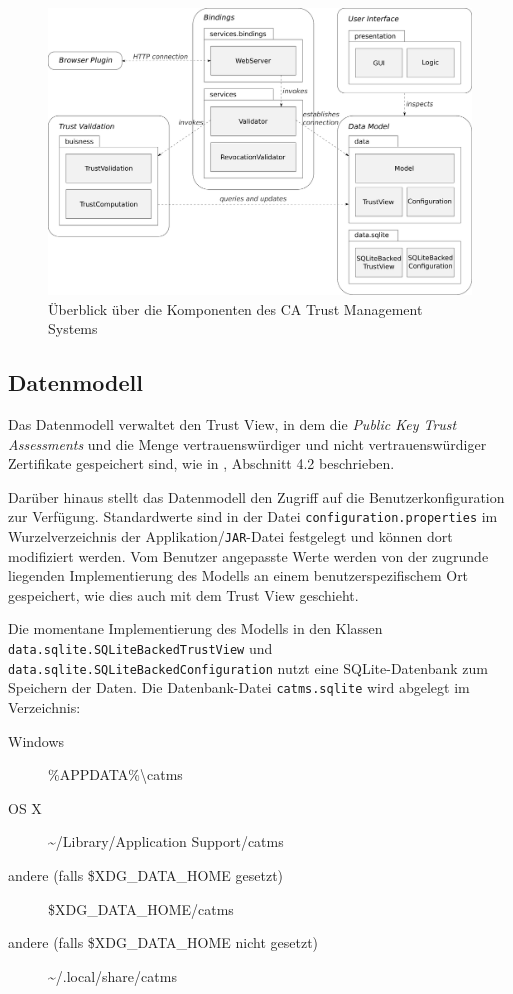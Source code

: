 \documentclass[accentcolor=tud1c,article,colorback,11pt]{tudreport}
\begin{document}
\begin{figure}[h]
  \centering
  \includegraphics[width=\textwidth]{overview}
  \caption{Überblick über die Komponenten des CA Trust Management Systems}
  \label{overview}
\end{figure}

\subsection{Datenmodell}
Das Datenmodell verwaltet den Trust View, in dem die \textit{Public Key Trust Assessments} und die Menge vertrauenswürdiger und nicht vertrauenswürdiger Zertifikate gespeichert sind, wie in \cite{braun2013trust}, Abschnitt 4.2 beschrieben.

Darüber hinaus stellt das Datenmodell den Zugriff auf die Benutzerkonfiguration zur Verfügung. Standardwerte sind in der Datei \texttt{configuration.properties} im Wurzelverzeichnis der Applikation/\texttt{JAR}-Datei festgelegt und können dort modifiziert werden. Vom Benutzer angepasste Werte werden von der zugrunde liegenden Implementierung des Modells an einem benutzerspezifischem Ort gespeichert, wie dies auch mit dem Trust View geschieht.

Die momentane Implementierung des Modells in den Klassen \texttt{data.sqlite.SQLiteBackedTrustView} und \texttt{data.sqlite.SQLiteBackedConfiguration} nutzt eine SQLite-Datenbank zum Speichern der Daten. Die Datenbank-Datei \texttt{catms.sqlite} wird abgelegt im Verzeichnis:

\vspace{1em}
\begin{minipage}{\textwidth}
\begin{description}
\item[Windows] \%APPDATA\%\textbackslash catms
\item[OS X] \textasciitilde/Library/Application Support/catms
\item[andere (falls \$XDG\_DATA\_HOME gesetzt)] \$XDG\_DATA\_HOME/catms
\item[andere (falls \$XDG\_DATA\_HOME nicht gesetzt)] \textasciitilde/.local/share/catms
\end{description}
\end{minipage}
\vspace{1em}
\end{document}
